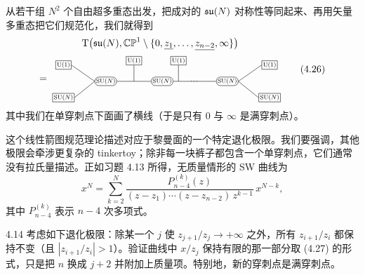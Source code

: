  从若干组 $N^2$ 个自由超多重态出发，把成对的 $\mathfrak{su}(N)$ 对称性等同起来、再用矢量多重态把它们规范化，我们就得到
\begin{equation}
\begin{gathered}
\mathrm{T}\big(\fsu(N),\mathbb{CP}^1\setminus\{0,\underline{z_1},\dots,
  \underline{z_{n-2}},\infty\}\big)\\[2pt]
=\;\begin{tikzpicture}[baseline=(G1.center),scale=0.78,transform shape,
  fl/.style={draw,rectangle,inner sep=1.6pt,font=\footnotesize},
  ga/.style={draw,rounded corners=4pt,inner sep=1.6pt,font=\footnotesize}]
  \node[ga] (G1) at (0,0) {$\mathrm{SU}(N)$};
  \node[ga] (G2) at (2.6,0) {$\mathrm{SU}(N)$};
  \node[ga] (G3) at (5.6,0) {$\mathrm{SU}(N)$};
  \node[font=\footnotesize] at (4.1,0) {$\cdots$};
  \node[fl] (UL) at (-1.95,0.75) {$\mathrm{U}(1)$};
  \node[fl] (SL) at (-1.95,-0.75){$\mathrm{SU}(N)$};
  \node[fl] (U12) at (1.3,0.95) {$\mathrm{U}(1)$};
  \node[fl] (U23) at (3.35,0.95) {$\mathrm{U}(1)$};
  \node[fl] (UR) at (7.55,0.75) {$\mathrm{U}(1)$};
  \node[fl] (SR) at (7.55,-0.75){$\mathrm{SU}(N)$};
  \draw (UL.east) -- (G1.west);
  \draw (SL.east) -- (G1.west);
  \draw (G1.east) -- (G2.west);
  \draw (U12.south) -- (1.3,0);
  \draw (U23.south) -- (3.35,0);
  \draw (G2.east) -- (G3.west);
  \draw (G3.east) -- (UR.west);
  \draw (G3.east) -- (SR.west);
\end{tikzpicture}
\end{gathered}
  \tag{4.26}
\end{equation}
其中我们在单穿刺点下面画了横线（于是只有 $0$ 与 $\infty$ 是满穿刺点）。

这个线性箭图规范理论描述对应于黎曼面的一个特定退化极限。我们要强调，其他极限会牵涉更复杂的 tinkertoy；除非每一块裤子都包含一个单穿刺点，它们通常没有拉氏量描述。正如习题 4.13 所得，无质量情形的 SW 曲线为
\begin{equation}
  x^N=\sum_{k=2}^{N}\frac{P^{(k)}_{n-4}(z)}
    {(z-z_1)\cdots(z-z_{n-2})\,z^{k-1}}\,x^{N-k},
  \tag{4.27}
\end{equation}
其中 $P^{(k)}_{n-4}$ 表示 $n-4$ 次多项式。


\begin{exercise}{4.14}
考虑如下退化极限：除某一个 $j$ 使 $z_{j+1}/z_j\to+\infty$ 之外，所有 $z_{i+1}/z_i$ 都保持不变（且 $|z_{i+1}/z_i|>1$）。验证曲线中 $x/z_j$ 保持有限的那一部分取 (4.27) 的形式，只是把 $n$ 换成 $j+2$ 并附加上质量项。特别地，新的穿刺点是满穿刺点。
\end{exercise}
